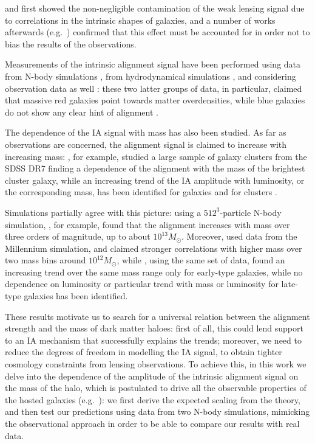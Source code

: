\documentclass[a4paper,11pt]{article}
\begin{document}
\cite{Heavensetal2000} and \cite{CroftMetzler2000} first showed the non-negligible contamination of the weak lensing signal due to correlations in the intrinsic shapes of galaxies, and a number of works afterwards (e.g.\ \cite{Heymansetal2006, Sembolonietal2008}) confirmed that this effect must be accounted for in order not to bias the results of the observations.

Measurements of the intrinsic alignment signal have been performed using data from N-body simulations \cite{Heymansetal2006, Kuhlenetal2007, Leeetal2008, Schneideretal2012, Joachimietal2013a, Joachimietal2013b}, from hydrodynamical simulations \cite{Codisetal2015, Velliscigetal2015b, Chisarietal2015, Tennetietal2016, Hilbertetal2017}, and considering observation data as well \cite{Joachimietal2011, Haoetal2011, Lietal2013, Singhetal2015, vanUitertJoachimi2017}: these two latter groups of data, in particular, claimed that massive red galaxies point towards matter overdensities, while blue galaxies do not show any clear hint of alignment \cite{Hirataetal2007, Mandelbaumetal2011}. 

The dependence of the IA signal with mass has also been studied. As far as observations are concerned, the alignment signal is claimed to increase with increasing mass: \cite{Haoetal2011}, for example, studied a large sample of galaxy clusters from the SDSS DR7 finding a dependence of the alignment with the mass of the brightest cluster galaxy, while an increasing trend of the IA amplitude with luminosity, or the corresponding mass, has been identified for galaxies \cite{Joachimietal2011, Singhetal2015} and for clusters \cite{vanUitertJoachimi2017}. 

Simulations partially agree with this picture: using a $512^3$-particle N-body simulation, \cite{Jing2002}, for example, found that the alignment increases with mass over three orders of magnitude, up to about $10^{13} M_{\odot}$. Moreover, \cite{Leeetal2008} used data from the Millennium simulation, and claimed stronger correlations with higher mass over two mass bins around $10^{12} M_{\odot}$, while \cite{Joachimietal2013b}, using the same set of data, found an increasing trend over the same mass range only for early-type galaxies, while no dependence on luminosity or particular trend with mass or luminosity for late-type galaxies has been identified. 

These results motivate us to search for a universal relation between the alignment strength and the mass of dark matter haloes: first of all, this could lend support to an IA mechanism that successfully explains the trends; moreover, we need to reduce the degrees of freedom in modelling the IA signal, to obtain tighter cosmology constraints from lensing observations. To achieve this, in this work we delve into the dependence of the amplitude of the intrinsic alignment signal on the mass of the halo, which is postulated to drive all the observable properties of the hosted galaxies (e.g.\ \cite{Joachimietal2015}): we first derive the expected scaling from the theory, and then test our predictions using data from two N-body simulations, mimicking the observational approach in order to be able to compare our results with real data.
\end{document}
